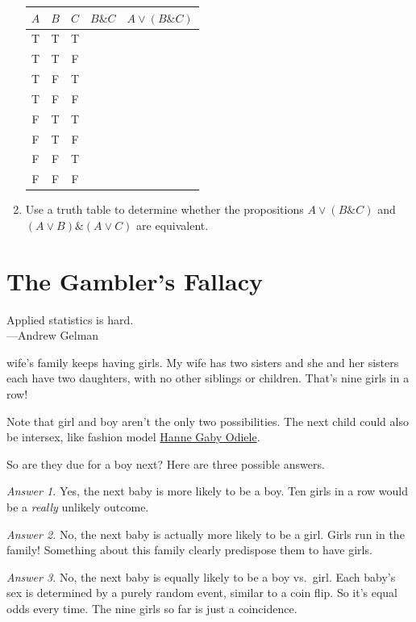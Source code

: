 \documentclass[justified]{tufte-book}
\renewcommand{\wedge}{\mathbin{\&}}
\newenvironment{epigraph}%
{
\begin{flushright}    
\begin{minipage}{20em}
\begin{flushright}
\itshape
}%
{
\end{flushright}
\end{minipage}
\end{flushright}
}
\theoremstyle{definition}
\theoremstyle{definition}
\theoremstyle{definition}
\theoremstyle{remark}
\begin{document}
\begin{enumerate}
  \begin{longtable}[]{@{}ccccc@{}}
  \toprule
  \(A\) & \(B\) & \(C\) & \(B \wedge C\) & \(A \vee (B \wedge C)\)\tabularnewline
  \midrule
  \endhead
  T & T & T & &\tabularnewline
  T & T & F & &\tabularnewline
  T & F & T & &\tabularnewline
  T & F & F & &\tabularnewline
  F & T & T & &\tabularnewline
  F & T & F & &\tabularnewline
  F & F & T & &\tabularnewline
  F & F & F & &\tabularnewline
  \bottomrule
  \end{longtable}
\item
  Use a truth table to determine whether the propositions \(A \vee (B \wedge C)\) and \((A \vee B) \wedge (A \vee C)\) are equivalent.
\end{enumerate}

\hypertarget{the-gamblers-fallacy}{%
\chapter{The Gambler's Fallacy}\label{the-gamblers-fallacy}}

\begin{epigraph}
Applied statistics is hard.\\
---Andrew Gelman
\end{epigraph}

 wife's family keeps having girls. My wife has two sisters and she and her sisters each have two daughters, with no other siblings or children. That's nine girls in a row!

\begin{marginfigure}
Note that girl and boy aren't the only two possibilities. The next child
could also be intersex, like fashion model
\href{https://en.wikipedia.org/wiki/Hanne_Gaby_Odiele}{Hanne Gaby
Odiele}.
\end{marginfigure}

So are they due for a boy next? Here are three possible answers.

\emph{Answer 1.} Yes, the next baby is more likely to be a boy. Ten girls in a row would be a \emph{really} unlikely outcome.

\emph{Answer 2.} No, the next baby is actually more likely to be a girl. Girls run in the family! Something about this family clearly predispose them to have girls.

\emph{Answer 3.} No, the next baby is equally likely to be a boy vs.~girl. Each baby's sex is determined by a purely random event, similar to a coin flip. So it's equal odds every time. The nine girls so far is just a coincidence.
\end{document}
